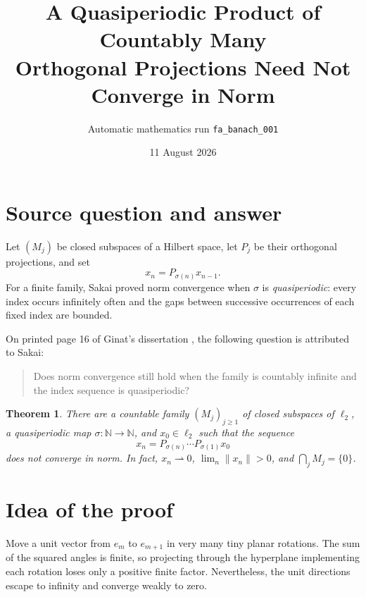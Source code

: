 \documentclass[11pt]{article}
\title{A Quasiperiodic Product of Countably Many\\
Orthogonal Projections Need Not Converge in Norm}
\author{Automatic mathematics run \texttt{fa\_banach\_001}}
\date{11 August 2026}
\newtheorem{theorem}{Theorem}
\newcommand{\N}{\mathbb N}
\begin{document}
\setlength{\emergencystretch}{3em}
\maketitle

\begin{center}
\end{center}

\section{Source question and answer}

Let $(M_j)$ be closed subspaces of a Hilbert space, let $P_j$ be their
orthogonal projections, and set
\[
 x_n=P_{\sigma(n)}x_{n-1}.
\]
For a finite family, Sakai proved norm convergence when $\sigma$ is
\emph{quasiperiodic}: every index occurs infinitely often and the gaps
between successive occurrences of each fixed index are bounded.

On printed page 16 of Ginat's dissertation \cite{source}, the following
question is attributed to Sakai:
\begin{quote}
Does norm convergence still hold when the family is countably infinite and
the index sequence is quasiperiodic?
\end{quote}

\begin{theorem}\label{thm:main}
There are a countable family $(M_j)_{j\geq1}$ of closed subspaces of
$\ell_2$, a quasiperiodic map $\sigma:\N\to\N$, and $x_0\in\ell_2$ such
that the sequence
\[
 x_n=P_{\sigma(n)}\cdots P_{\sigma(1)}x_0
\]
does not converge in norm.  In fact, $x_n\rightharpoonup0$,
$\lim_n\|x_n\|>0$, and $\bigcap_jM_j=\{0\}$.
\end{theorem}

\section{Idea of the proof}

Move a unit vector from $e_m$ to $e_{m+1}$ in very many tiny planar
rotations.  The sum of the squared angles is finite, so projecting through
the hyperplane implementing each rotation loses only a positive finite
factor.  Nevertheless, the unit directions escape to infinity and converge
weakly to zero.
\end{document}
